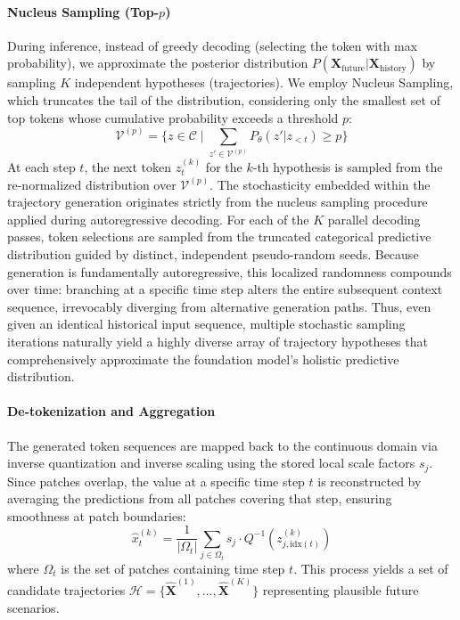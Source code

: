 \documentclass{article}
\begin{document}
\paragraph{Nucleus Sampling (Top-$p$)}
During inference, instead of greedy decoding (selecting the token with max probability), we approximate the posterior distribution $P(\mathbf{X}_{\text{future}} | \mathbf{X}_{\text{history}})$ by sampling $K$ independent hypotheses (trajectories). We employ Nucleus Sampling, which truncates the tail of the distribution, considering only the smallest set of top tokens whose cumulative probability exceeds a threshold $p$:
\begin{equation}
    \mathcal{V}^{(p)} = \{z \in \mathcal{C} \mid \sum_{z' \in \mathcal{V}^{(p)}} P_\theta(z'|z_{<t}) \geq p\}
\end{equation}
At each step $t$, the next token $z_t^{(k)}$ for the $k$-th hypothesis is sampled from the re-normalized distribution over $\mathcal{V}^{(p)}$. The stochasticity embedded within the trajectory generation originates strictly from the nucleus sampling procedure applied during autoregressive decoding. For each of the $K$ parallel decoding passes, token selections are sampled from the truncated categorical predictive distribution guided by distinct, independent pseudo-random seeds. Because generation is fundamentally autoregressive, this localized randomness compounds over time: branching at a specific time step alters the entire subsequent context sequence, irrevocably diverging from alternative generation paths. Thus, even given an identical historical input sequence, multiple stochastic sampling iterations naturally yield a highly diverse array of trajectory hypotheses that comprehensively approximate the foundation model's holistic predictive distribution.

\paragraph{De-tokenization and Aggregation}
The generated token sequences are mapped back to the continuous domain via inverse quantization and inverse scaling using the stored local scale factors $s_j$. Since patches overlap, the value at a specific time step $t$ is reconstructed by averaging the predictions from all patches covering that step, ensuring smoothness at patch boundaries:
\begin{equation}
    \hat{x}^{(k)}_t = \frac{1}{|\Omega_t|} \sum_{j \in \Omega_t} s_j \cdot Q^{-1}(z^{(k)}_{j, \text{idx}(t)})
\end{equation}
where $\Omega_t$ is the set of patches containing time step $t$. This process yields a set of candidate trajectories $\mathcal{H} = \{\hat{\mathbf{X}}^{(1)}, \dots, \hat{\mathbf{X}}^{(K)}\}$ representing plausible future scenarios.
\end{document}
